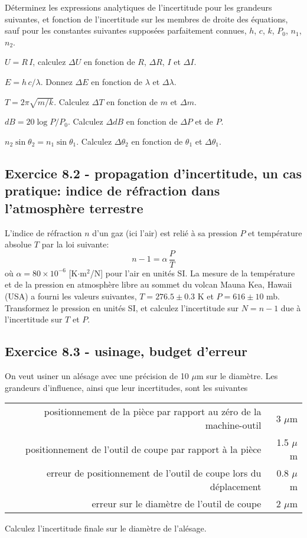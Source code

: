 Déterminez les expressions analytiques de l'incertitude pour les grandeurs suivantes, et fonction de l'incertitude sur les membres de droite des équations, sauf pour les constantes suivantes supposées parfaitement connues, $h$, $c$, $k$, $P_0$, $n_1$, $n_2$.
\begin{description}\renewcommand{\labelitemi}{$\bullet$}
\item[loi d'Ohm] $U=R\,I$, calculez $\Delta U$ en fonction de $R$, $\Delta R$, $I$ et $\Delta I$.
\item[Energie du photon] $E=h\,c/\lambda$. Donnez $\Delta E$ en fonction de $\lambda$ et $\Delta\lambda$.
\item[Période d'oscillation masse et ressort] $T=2\pi\sqrt{m/k}$. Calculez $\Delta T$ en fonction de $m$ et $\Delta m$.
\item[Décibels et puissance] $dB=20\log{P/P_0}$. Calculez $\Delta dB$ en fonction de $\Delta P$ et de $P$.
\item[Loi de Snell (optique)] $n_2\sin{\theta_2}=n_1\sin{\theta_1}$. Calculez $\Delta\theta_2$ en fonction de $\theta_1$ et $\Delta\theta_1$.
\end{description}

\subsection*{Exercice 8.2 - propagation d'incertitude, un cas pratique: indice de réfraction dans l'atmosphère terrestre}

L'indice de réfraction $n$ d'un gaz (ici l'air) est relié à sa pression $P$ et température absolue $T$ par la loi suivante:
$$
n-1=\alpha\,\frac{P}{T}
$$
où $\alpha=80\times10^{-6}$ [K$\cdot$m$^2$/N] pour l'air en unités SI. La mesure de la température et de la pression en atmosphère libre au sommet du volcan Mauna Kea, Hawaii (USA) a fourni les valeurs suivantes, $T=276.5\pm0.3$ K et $P=616\pm10$ mb. Transformez le pression en unités SI, et calculez l'incertitude sur $N=n-1$ due à l'incertitude sur $T$ et $P$.

\subsection*{Exercice 8.3 - usinage, budget d'erreur}

On veut usiner un alésage avec une précision de 10 $\mu$m sur le diamètre. Les grandeurs d'influence, ainsi que leur incertitudes, sont les suivantes
\begin{center}
\begin{tabular}{r|r}
positionnement de la pièce par rapport au zéro de la machine-outil & 3 $\mu$m \\
positionnement de l'outil de coupe par rapport à la pièce & 1.5 $\mu$m \\
erreur de positionnement de l'outil de coupe lors du déplacement & 0.8 $\mu$m \\
erreur sur le diamètre de l'outil de coupe & 2 $\mu$m
\end{tabular}
\end{center}
Calculez l'incertitude finale sur le diamètre de l'alésage.

